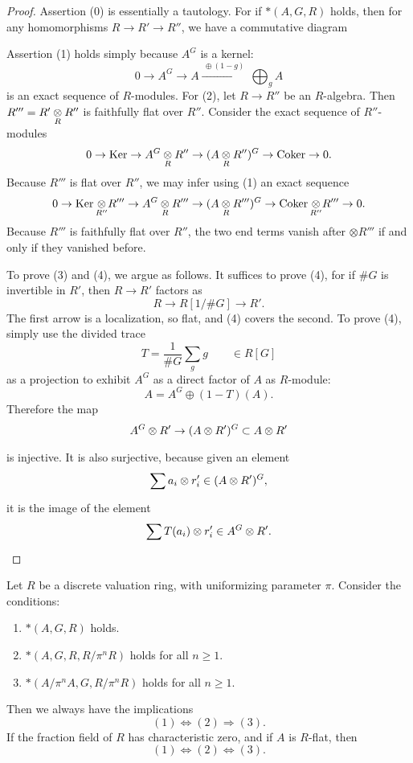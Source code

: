 \begin{proof}
Assertion (0) is essentially a tautology. For if $*(A,G,R)$ holds, then for any homomorphisms $R \to R' \to R''$, we have a commutative diagram
\begin{center}
\footnotesize
{}
\end{center}
Assertion (1) holds simply because $A^G$ is a kernel:
\[
0 \to A^G \to A \xrightarrow{\ \oplus(1-g)\ } \bigoplus_{g} A
\]
is an exact sequence of $R$-modules. For (2), let $R \to R''$ be an $R$-algebra. Then $R''' = R' \underset{R}{\otimes} R''$ is faithfully flat over $R''$. Consider the exact sequence of $R''$-modules
\[
0 \to \operatorname{Ker} \to A^G \underset{R}{\otimes} R'' \to (A \underset{R}{\otimes} R'')^G \to \operatorname{Coker} \to 0 .
\]
Because $R'''$ is flat over $R''$, we may infer using (1) an exact sequence
\[
0 \to \operatorname{Ker} \underset{R''}{\otimes} R''' \to A^G \underset{R}{\otimes} R''' \to (A \underset{R}{\otimes} R''')^G \to \operatorname{Coker} \underset{R''}{\otimes} R''' \to 0 .
\]
Because $R'''$ is faithfully flat over $R''$, the two end terms vanish after $\otimes R'''$ if and only if they vanished before.

To prove (3) and (4), we argue as follows. It suffices to prove (4), for if $\#G$ is invertible in $R'$, then $R \to R'$ factors as
\[
R \to R[1/\#G] \to R' .
\]
The first arrow is a localization, so flat, and (4) covers the second. To prove (4), simply use the divided trace
\[
T = \frac{1}{\#G}\sum_{g} g \qquad \in R[G]
\]
as a projection to exhibit $A^G$ as a direct factor of $A$ as $R$-module:
\[
A = A^G \oplus (1-T)(A) .
\]
Therefore the map
\[
A^G \underset{}{\otimes} R' \to (A \underset{}{\otimes} R')^G \subset A \underset{}{\otimes} R'
\]
is injective. It is also surjective, because given an element
\[
\sum a_i \underset{}{\otimes} r_i' \in (A \underset{}{\otimes} R')^G ,
\]
it is the image of the element
\[
\sum T(a_i) \underset{}{\otimes} r_i' \in A^G \underset{}{\otimes} R' .
\]
\end{proof}

\begin{appprop}\label{prop:A7.1.4}
Let $R$ be a discrete valuation ring, with uniformizing parameter $\pi$. Consider the conditions:
\begin{enumerate}[(1)]
\item $*(A,G,R)$ holds.
\item $*(A,G,R,R/\pi^n R)$ holds for all $n \geq 1$.
\item $*(A/\pi^n A, G, R/\pi^n R)$ holds for all $n \geq 1$.
\end{enumerate}
Then we always have the implications
\[
(1) \Longleftrightarrow (2) \Longrightarrow (3) .
\]
If the fraction field of $R$ has characteristic zero, and if $A$ is $R$-flat, then
\[
(1) \Longleftrightarrow (2) \Longleftrightarrow (3) .
\]
\end{appprop}

